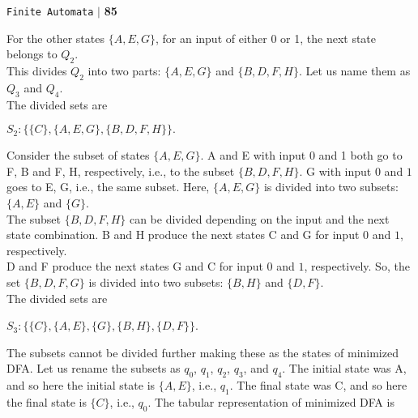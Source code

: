 \documentclass{article}
\begin{document}
\begin{flushright}
 \texttt{Finite Automata} \hspace*{0.10cm}\textbf{$|$} \textbf{85}\hspace*{0.5cm}
\end{flushright}


\vspace*{0.5cm}
For the other states $\{A, E, G\}$, for an input of either 0 or 1, the next state belongs to $Q_2$.\\
This divides $Q_2$ into two parts: $\{A, E, G\}$ and $\{B, D, F, H\}$. Let us name them as $Q_3$ and $Q_4$.\\
The divided sets are\\

\vspace*{0.3cm}

\begin{center}
  $S_2: \{\{C\}, \{A, E, G\}, \{B, D, F, H\}\}.$ \\
\end{center}


Consider the subset of states $\{A, E, G\}$. A and E with input 0 and 1 both go to F, B and F, H, respectively,
i.e., to the subset $\{B, D, F, H\}$. G with input $0$ and $1$ goes to E, G, i.e., the same subset. Here, $\{A, E, G\}$
is divided into two subsets: $\{A, E\}$ and $\{G\}$.\\

\hspace*{0.4cm} The subset $\{B, D, F, H\}$ can be divided depending on the input and the next state combination. B and
H produce the next states C and G for input $0$ and $1$, respectively.\\
\hspace*{0.4cm} D and F produce the next states G and C for input $0$ and $1$, respectively. So, the set $\{B, D, F, G\}$ is
divided into two subsets: $\{B, H\}$ and $\{D, F\}$.\\
\hspace*{0.4cm} The divided sets are\\

\vspace*{0.3cm}
\begin{center}
  $S_3: \{\{C\}, \{A, E\}, \{G\}, \{B, H\}, \{D, F\}\} $. \\
\end{center}


The subsets cannot be divided further making these as the states of minimized DFA. Let us rename the
subsets as $q_0$, $q_1$, $q_2$, $q_3$, and $q_4$. The initial state was A, and so here the initial state is $\{A, E\}$, i.e., $q_1$. The
final state was C, and so here the final state is $\{C\}$, i.e., $q_0$. The tabular representation of minimized DFA is\\
\end{document}
